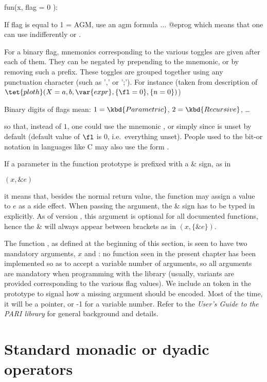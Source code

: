 \bprog
fun(x, {flag = 0} ):

  If flag is equal to 1 = AGM, use an agm formula ...
@eprog\noindent
which means that one can use indifferently  or
.

For a binary flag, mnemonics corresponding to the various toggles are given
after each of them. They can be negated by prepending  to the
mnemonic, or by removing such a prefix. These toggles are grouped together
using any punctuation character (such as ',' or ';'). For instance (taken
from description of $\tet{ploth}(X=a,b,\var{expr},\{\fl=0\},\{n=0\})$)

\centerline{Binary digits of flags mean: $1=\kbd{Parametric}$,
$2=\kbd{Recursive}$, \dots}

\noindent so that, instead of $1$, one could use the mnemonic
, or simply  since
 is unset by default (default value of $\fl$ is $0$,
i.e.~everything unset). People used to the bit-or notation in languages like
C may also use the form .

  If a parameter in the function
prototype is prefixed with a \& sign, as in

$(x,\&e)$

\noindent it means that, besides the normal return value, the function may
assign a value to $e$ as a side effect. When passing the argument, the \&
sign has to be typed in explicitly. As of version \vers, this 
argument is optional for all documented functions, hence the \& will always
appear between brackets as in $(x,\{\&e\})$.

The  function , as defined at the beginning of this
section, is seen to have two mandatory arguments, $x$ and \fl: no function
seen in the present chapter has been implemented so as to accept a variable
number of arguments, so all arguments are mandatory when programming with the
library (usually, variants are provided corresponding to the various flag values).
We include an  token in the prototype to signal how a missing
argument should be encoded. Most of the time, it will be a  pointer, or
-1 for a variable number. Refer to the \emph{User's Guide to the PARI library}
for general background and details.

\section{Standard monadic or dyadic operators}

